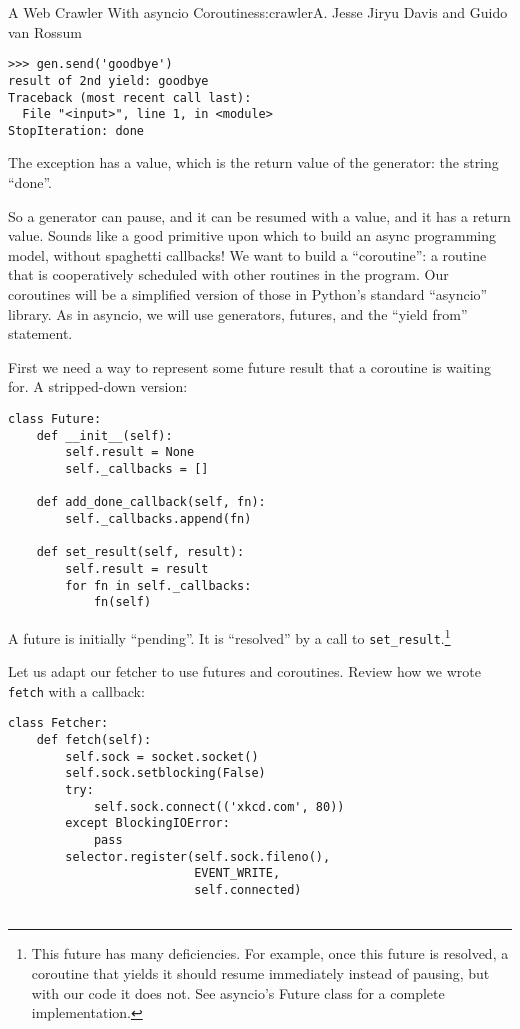 \begin{aosachapter}{A Web Crawler With asyncio Coroutines}{s:crawler}{A. Jesse Jiryu Davis and Guido van Rossum}
\begin{verbatim}
>>> gen.send('goodbye')
result of 2nd yield: goodbye
Traceback (most recent call last):
  File "<input>", line 1, in <module>
StopIteration: done
\end{verbatim}

The exception has a value, which is the return value of the generator:
the string ``done''.

\label{building-coroutines-with-generators}

So a generator can pause, and it can be resumed with a value, and it has
a return value. Sounds like a good primitive upon which to build an
async programming model, without spaghetti callbacks! We want to build a
``coroutine'': a routine that is cooperatively scheduled with other
routines in the program. Our coroutines will be a simplified version of
those in Python's standard ``asyncio'' library. As in asyncio, we will
use generators, futures, and the ``yield from'' statement.

First we need a way to represent some future result that a coroutine is
waiting for. A stripped-down version:

\begin{verbatim}
class Future:
    def __init__(self):
        self.result = None
        self._callbacks = []

    def add_done_callback(self, fn):
        self._callbacks.append(fn)

    def set_result(self, result):
        self.result = result
        for fn in self._callbacks:
            fn(self)
\end{verbatim}

A future is initially ``pending''. It is ``resolved'' by a call to
\texttt{set\_result}.\footnote{This future has many deficiencies. For
  example, once this future is resolved, a coroutine that yields it
  should resume immediately instead of pausing, but with our code it
  does not. See asyncio's Future class for a complete implementation.}

Let us adapt our fetcher to use futures and coroutines. Review how we
wrote \texttt{fetch} with a callback:

\begin{verbatim}
class Fetcher:
    def fetch(self):
        self.sock = socket.socket()
        self.sock.setblocking(False)
        try:
            self.sock.connect(('xkcd.com', 80))
        except BlockingIOError:
            pass
        selector.register(self.sock.fileno(),
                          EVENT_WRITE,
                          self.connected)


\end{verbatim}
\end{aosachapter}

